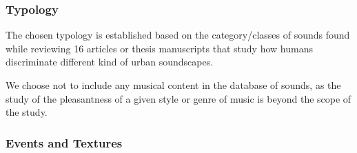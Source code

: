 \documentclass[twoside,twocolumn]{article}
\begin{document}
\subsubsection*{Typology}



The chosen typology is established based on the category/classes of sounds found while reviewing 16 articles or thesis manuscripts \cite{maffiolo_caracterisation_1999,raimbault2002simulation,guastavino_etude_2003,defreville2004aactivity,raimbault2005urban,dubois2006cognitive,devergie_relations_2006,guastavino2006ideal,niessen2010categories,maffiolo_caracterisation_1999,beaumont2004pertinence,polack2008perceptive,leobon_analyse_1986,brown2011towards} that study how humans discriminate different kind of urban soundscapes.


We choose not to include any musical content in the database of sounds, as the study of the pleasantness of a given style or genre of music is beyond the scope of the study.

\subsubsection*{Events and Textures}

\end{document}
